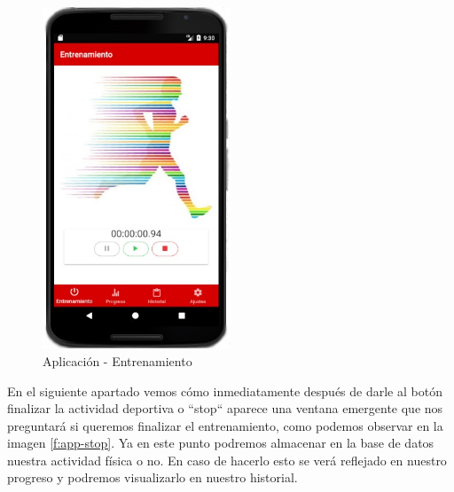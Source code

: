 \documentclass[a4paper, 11pt]{article}
\begin{document}
\begin{itemize}
                \begin{figure}[H]
                 \centering
                 \includegraphics[width=0.5\textwidth]{3pause}
                 \caption{Aplicación - Entrenamiento}
                 \label{f:app-pause}
                \end{figure}

      En el siguiente apartado vemos cómo inmediatamente después de darle al botón finalizar la actividad
      deportiva o ``stop`` aparece una ventana emergente que nos preguntará si queremos finalizar el
      entrenamiento, como podemos observar en la imagen \ref{f:app-stop}. Ya en este punto podremos almacenar
      en la base de datos nuestra actividad física o no. En caso de hacerlo esto se verá reflejado en
      nuestro progreso y podremos visualizarlo en nuestro historial.\\



\end{itemize}
\end{document}

